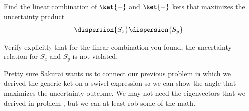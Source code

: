 \begin{question}

  \begin{questionpart}
    Find the linear combination of $\ket{+}$ and $\ket{-}$ kets that
    maximizes the uncertainty product
    \begin{equation*}
      \dispersion{S_x}\dispersion{S_y}
    \end{equation*}
  \end{questionpart}
  
  \begin{questionpart}
    Verify explicitly that for the linear combination you found, the
    uncertainty relation for $S_x$ and $S_y$ is not violated.
  \end{questionpart}
  
\end{question}

\begin{purpose}
  Pretty sure Sakurai wants us to connect our previous problem in
  which we derived the generic ket-on-a-swivel expression so we can
  show the angle that maximizes the uncertainty outcome.  We may not
  need the eigenvectors that we derived in problem
  , but we can at least rob some of the math.
\end{purpose}

